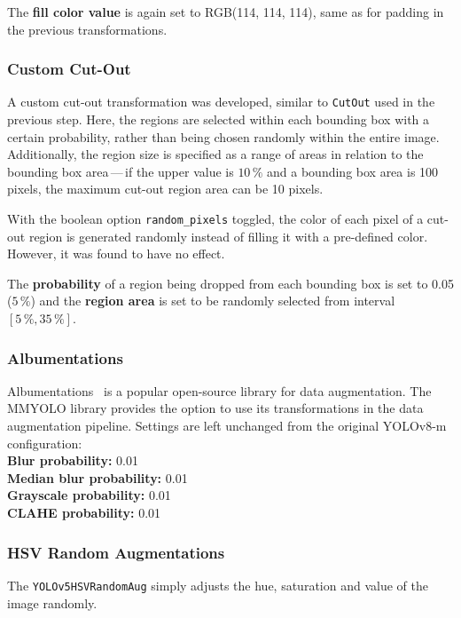 The \textbf{fill color value} is again set to RGB(114, 114, 114), same as for
padding in the previous transformations.

\subsubsection*{Custom Cut-Out}

A custom cut-out transformation was developed, similar to \texttt{CutOut} used
in the previous step. Here, the regions are selected within each bounding box
with a certain probability, rather than being chosen randomly within the entire image.
Additionally, the region size is specified as a range of areas in relation to the
bounding box area\,---\,if the upper value is $10\,\%$ and a bounding box area is 100
pixels, the maximum cut-out region area can be 10 pixels.

With the boolean option \texttt{random\_pixels} toggled, the color of each pixel
of a cut-out region is generated randomly instead of filling it with a
pre-defined color. However, it was found to have no effect.

The \textbf{probability} of a region being dropped from each bounding box is set
to \num{0.05} ($5\,\%$) and the \textbf{region area} is set to be randomly selected from
interval $[5\,\%, 35\,\%]$.

\subsubsection*{Albumentations}

Albumentations~\cite{Albumentations} is a popular open-source library for data
augmentation. The MMYOLO library provides the option to use its transformations
in the data augmentation pipeline. Settings are left unchanged from the original
YOLOv8-m configuration: \\
\textbf{Blur probability:} 0.01 \\
\textbf{Median blur probability:} 0.01 \\
\textbf{Grayscale probability:} 0.01 \\
\textbf{CLAHE probability:} 0.01

\subsubsection*{HSV Random Augmentations}

The \texttt{YOLOv5HSVRandomAug} simply adjusts the hue, saturation and value of
the image randomly.

